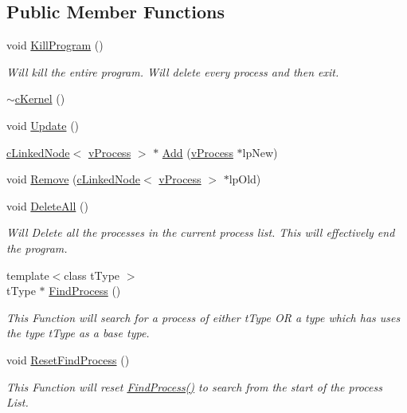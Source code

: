 \subsection*{Public Member Functions}
\begin{DoxyCompactItemize}
\item 
void \hyperlink{classc_kernel_a721f5ad665c512b511ff8d344010385e}{KillProgram} ()
\begin{DoxyCompactList}\small\item\em Will kill the entire program. Will delete every process and then exit. \item\end{DoxyCompactList}\item 
\hyperlink{classc_kernel_aa17d85bb9118c9de59fe0c6301301a39}{$\sim$cKernel} ()
\item 
void \hyperlink{classc_kernel_afbbf3ca5d7f5db9c91f1c279c0109b2f}{Update} ()
\item 
\hyperlink{classc_linked_node}{cLinkedNode}$<$ \hyperlink{classv_process}{vProcess} $>$ $\ast$ \hyperlink{classc_kernel_a4ec4faedede9de3cae4fc5fbc4469a1b}{Add} (\hyperlink{classv_process}{vProcess} $\ast$lpNew)
\item 
void \hyperlink{classc_kernel_a59c9a956e6a6666a57c2d85e463381d8}{Remove} (\hyperlink{classc_linked_node}{cLinkedNode}$<$ \hyperlink{classv_process}{vProcess} $>$ $\ast$lpOld)
\item 
void \hyperlink{classc_kernel_af4c3e32a55fdef58236378eed46afdfe}{DeleteAll} ()
\begin{DoxyCompactList}\small\item\em Will Delete all the processes in the current process list. This will effectively end the program. \item\end{DoxyCompactList}\item 
{\footnotesize template$<$class tType $>$ }\\tType $\ast$ \hyperlink{classc_kernel_a56083c090177a8a2a9bb50ad58e712c3}{FindProcess} ()
\begin{DoxyCompactList}\small\item\em This Function will search for a process of either tType OR a type which has uses the type tType as a base type. \item\end{DoxyCompactList}\item 
void \hyperlink{classc_kernel_a42d5d224af7acfe4aee27b7cee2b0a02}{ResetFindProcess} ()
\begin{DoxyCompactList}\small\item\em This Function will reset \hyperlink{classc_kernel_a56083c090177a8a2a9bb50ad58e712c3}{FindProcess()} to search from the start of the process List. \item\end{DoxyCompactList}\end{DoxyCompactItemize}
